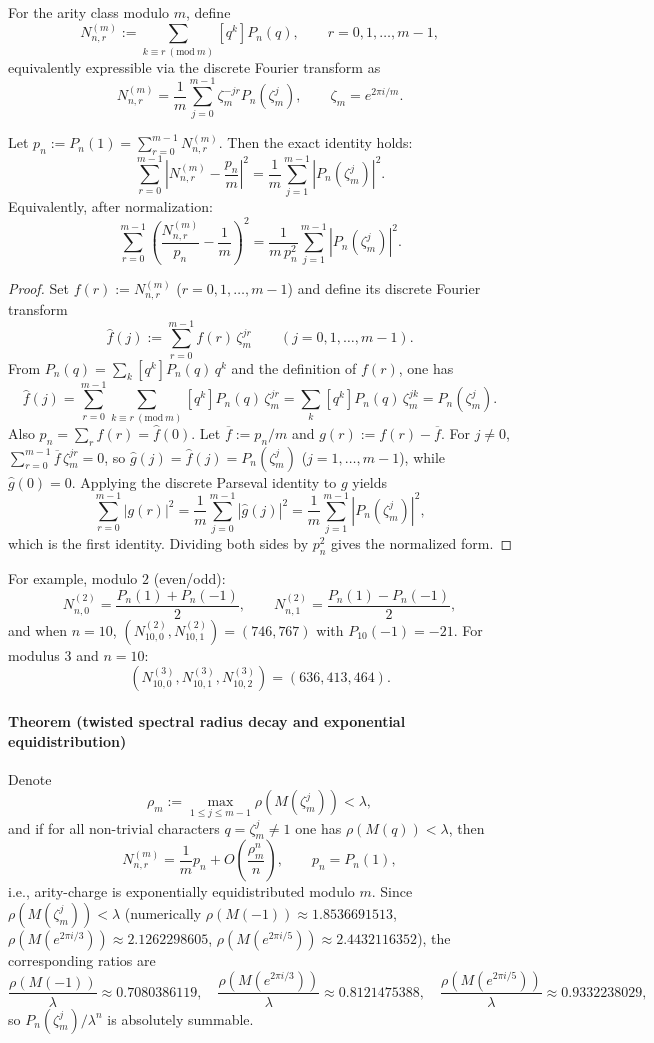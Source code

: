 For the arity class modulo $m$, define
\[
N_{n,r}^{(m)}:=\sum_{k\equiv r\ (\mathrm{mod}\ m)}[q^k]P_n(q),
\qquad r=0,1,\dots,m-1,
\]
equivalently expressible via the discrete Fourier transform as
\[
N_{n,r}^{(m)}=\frac{1}{m}\sum_{j=0}^{m-1}\zeta_m^{-jr}P_n(\zeta_m^j),
\qquad \zeta_m=e^{2\pi i/m}.
\]
\begin{theorem}\label{thm:real-input-40-arity-charge-parseval-energy}
Let \(p_n:=P_n(1)=\sum_{r=0}^{m-1}N_{n,r}^{(m)}\). Then the exact identity holds:
\[
\sum_{r=0}^{m-1}\left|N_{n,r}^{(m)}-\frac{p_n}{m}\right|^2
=\frac{1}{m}\sum_{j=1}^{m-1}\left|P_n(\zeta_m^j)\right|^2.
\]
Equivalently, after normalization:
\[
\sum_{r=0}^{m-1}\left(\frac{N_{n,r}^{(m)}}{p_n}-\frac{1}{m}\right)^2
=\frac{1}{m\,p_n^2}\sum_{j=1}^{m-1}\left|P_n(\zeta_m^j)\right|^2.
\]
\end{theorem}
\begin{proof}
Set \(f(r):=N_{n,r}^{(m)}\) (\(r=0,1,\dots,m-1\)) and define its discrete Fourier transform
\[
\widehat f(j):=\sum_{r=0}^{m-1} f(r)\,\zeta_m^{jr}\qquad (j=0,1,\dots,m-1).
\]
From \(P_n(q)=\sum_k [q^k]P_n(q)\,q^k\) and the definition of \(f(r)\), one has
\[
\widehat f(j)=\sum_{r=0}^{m-1}\sum_{k\equiv r\ (\mathrm{mod}\ m)}[q^k]P_n(q)\,\zeta_m^{jr}
=\sum_k [q^k]P_n(q)\,\zeta_m^{jk}
=P_n(\zeta_m^j).
\]
Also \(p_n=\sum_r f(r)=\widehat f(0)\). Let \(\overline f:=p_n/m\) and \(g(r):=f(r)-\overline f\).
For \(j\neq 0\), \(\sum_{r=0}^{m-1}\overline f\,\zeta_m^{jr}=0\), so \(\widehat g(j)=\widehat f(j)=P_n(\zeta_m^j)\) (\(j=1,\dots,m-1\)), while \(\widehat g(0)=0\).
Applying the discrete Parseval identity to \(g\) yields
\[
\sum_{r=0}^{m-1}|g(r)|^2=\frac{1}{m}\sum_{j=0}^{m-1}|\widehat g(j)|^2
=\frac{1}{m}\sum_{j=1}^{m-1}|P_n(\zeta_m^j)|^2,
\]
which is the first identity. Dividing both sides by \(p_n^2\) gives the normalized form.
\end{proof}
For example, modulo $2$ (even/odd):
\[
N_{n,0}^{(2)}=\frac{P_n(1)+P_n(-1)}{2},\qquad
N_{n,1}^{(2)}=\frac{P_n(1)-P_n(-1)}{2},
\]
and when $n=10$, $(N_{10,0}^{(2)},N_{10,1}^{(2)})=(746,767)$ with $P_{10}(-1)=-21$.
For modulus $3$ and $n=10$:
\[
(N_{10,0}^{(3)},N_{10,1}^{(3)},N_{10,2}^{(3)})=(636,413,464).
\]
\paragraph{Theorem (twisted spectral radius decay and exponential equidistribution)}
Denote
\[
\rho_m:=\max_{1\le j\le m-1}\rho(M(\zeta_m^j))<\lambda,
\]
and if for all non-trivial characters $q=\zeta_m^j\neq 1$ one has $\rho(M(q))<\lambda$, then
\[
N_{n,r}^{(m)}=\frac{1}{m}p_n+O\!\left(\frac{\rho_m^n}{n}\right),
\qquad p_n=P_n(1),
\]
i.e., arity-charge is exponentially equidistributed modulo $m$.
Since $\rho(M(\zeta_m^j))<\lambda$ (numerically
$\rho(M(-1))\approx 1.8536691513$,
$\rho(M(e^{2\pi i/3}))\approx 2.1262298605$,
$\rho(M(e^{2\pi i/5}))\approx 2.4432116352$),
the corresponding ratios are
\[
\frac{\rho(M(-1))}{\lambda}\approx 0.7080386119,\quad
\frac{\rho(M(e^{2\pi i/3}))}{\lambda}\approx 0.8121475388,\quad
\frac{\rho(M(e^{2\pi i/5}))}{\lambda}\approx 0.9332238029,
\]
so $P_n(\zeta_m^j)/\lambda^n$ is absolutely summable.
